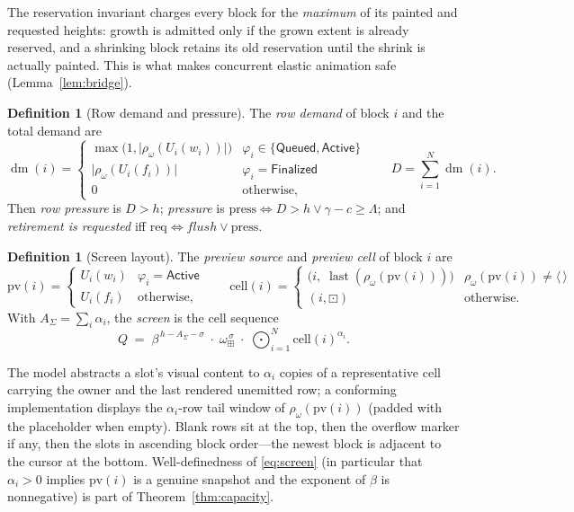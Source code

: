 \documentclass[11pt]{article}
\newcommand{\seq}[1]{\langle #1\rangle}
\newcommand{\emptyseq}{\seq{\,}}
\newcommand{\len}[1]{\lvert #1\rvert}
\newcommand{\cat}{\mathbin{\cdot}}             %
\newcommand{\Cat}{\bigodot}                    %
\newcommand{\PhRow}{\boxdot}                   %
\newcommand{\BlRow}{\square}                   %
\newcommand{\OvRow}{\boxplus}                  %
\newcommand{\Bcell}{\beta}                     %
\newcommand{\Ocell}{\omega_{\OvRow}}
\newcommand{\Queued}{\mathsf{Queued}}
\newcommand{\Active}{\mathsf{Active}}
\newcommand{\Finalized}{\mathsf{Finalized}}
\newcommand{\ren}[1]{\rho_{#1}}
\newcommand{\Un}{U}
\newcommand{\Press}{\mathrm{press}}
\newcommand{\Req}{\mathrm{req}}
\newcommand{\Scr}{Q}
\newcommand{\flush}{\mathit{flush}}
\newcommand{\created}{\gamma}
\newcommand{\MaxLive}{\Lambda}
\newcommand{\ps}{\mathrm{pv}}
\newcommand{\pc}{\mathrm{cell}}
\DeclareMathOperator{\dm}{dm}
\DeclareMathOperator{\last}{last}
\theoremstyle{definition}
\newtheorem{definition}[theorem]{Definition}
\theoremstyle{remark}
\begin{document}
The reservation invariant charges every block for the \emph{maximum} of its
painted and requested heights: growth is admitted only if the grown extent is
already reserved, and a shrinking block retains its old reservation until the
shrink is actually painted. This is what makes concurrent elastic animation
safe (Lemma~\ref{lem:bridge}).

\begin{definition}[Row demand and pressure]\label{def:pressure}
The \emph{row demand} of block $i$ and the total demand are
\[
  \dm(i)=\begin{cases}
    \max\bigl(1,\len{\ren{\omega}(\Un_i(w_i))}\bigr)
      & \varphi_i\in\{\Queued,\Active\}\\
    \len{\ren{\omega}(\Un_i(f_i))}
      & \varphi_i=\Finalized\\
    0 & \text{otherwise,}
  \end{cases}
  \qquad
  D=\sum_{i=1}^{N}\dm(i).
\]
Then \emph{row pressure} is $D>h$; \emph{pressure} is
$\Press \iff D>h \vee \created-c\ge\MaxLive$; and \emph{retirement is
requested} iff $\Req \iff \flush\vee\Press$.
\end{definition}

\begin{definition}[Screen layout]\label{def:screen}
The \emph{preview source} and \emph{preview cell} of block $i$ are
\[
  \ps(i)=\begin{cases}\Un_i(w_i)&\varphi_i=\Active\\ \Un_i(f_i)&
  \text{otherwise,}\end{cases}
  \qquad
  \pc(i)=\begin{cases}
    \bigl(i,\;\last(\ren{\omega}(\ps(i)))\bigr)
      & \ren{\omega}(\ps(i))\ne\emptyseq\\
    (i,\PhRow) & \text{otherwise.}
  \end{cases}
\]
With $A_{\Sigma}=\sum_i \alpha_i$, the \emph{screen} is the cell sequence
\begin{equation}\label{eq:screen}
  \Scr \;=\; \Bcell^{\,h-A_{\Sigma}-\sigma}
  \;\cat\; \Ocell^{\,\sigma}
  \;\cat\; \Cat_{i=1}^{N} \pc(i)^{\alpha_i}.
\end{equation}
\end{definition}

The model abstracts a slot's visual content to $\alpha_i$ copies of a
representative cell carrying the owner and the last rendered unemitted row; a
conforming implementation displays the $\alpha_i$-row tail window of
$\ren{\omega}(\ps(i))$ (padded with the placeholder when empty). Blank rows
sit at the top, then the overflow marker if any, then the slots in ascending
block order---the newest block is adjacent to the cursor at the bottom.
Well-definedness of \eqref{eq:screen} (in particular that $\alpha_i>0$ implies
$\ps(i)$ is a genuine snapshot and the exponent of $\Bcell$ is nonnegative) is
part of Theorem~\ref{thm:capacity}.
\end{document}
